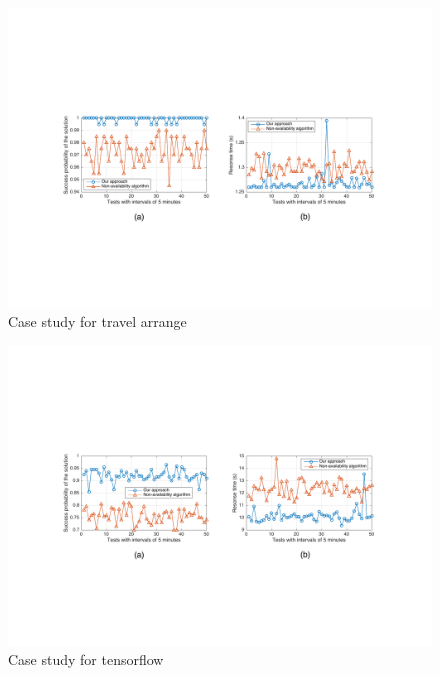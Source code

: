 \documentclass[journal]{IEEEtran}
\begin{document}
\begin{figure}[!t]
\centering
\includegraphics[width=6in]{./img/Task-6.pdf}
\caption{Case study for travel arrange}
\label{Task-6}
\end{figure}


\begin{figure}[!t]
\centering
\includegraphics[width=6in]{./img/Task-12.pdf}
\caption{Case study for tensorflow}
\label{Task-12}
\end{figure}
\end{document}
